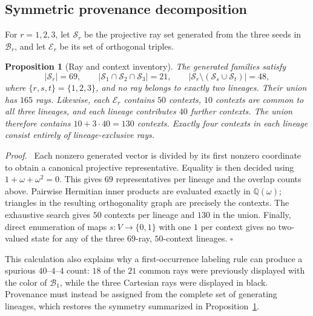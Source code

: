 \documentclass[%
  reprint,
  superscriptaddress,
  showpacs,
  showkeys,
  amsmath,amssymb,
  pra,
  longbibliography,
  floatfix,
  x11names
]{revtex4-2}
\newenvironment{revision}{\begingroup\color{revisionblue}}{\endgroup}
\newtheorem{proposition}{Proposition}
\newenvironment{proof}{\par\noindent\textit{Proof.}\ }{\hfill$\square$\par}
\begin{document}
\begin{revision}
\subsection{Symmetric provenance decomposition}

For $r=1,2,3$, let $\mathcal{S}_r$ be the projective ray set generated from the three seeds in $\mathcal{B}_r$, and let $\mathcal{E}_r$ be its set of orthogonal triples.

\begin{proposition}[Ray and context inventory]
\label{prop:provenance}
The generated families satisfy
\[
|\mathcal{S}_r|=69,\qquad
|\mathcal{S}_1\cap\mathcal{S}_2\cap\mathcal{S}_3|=21,
\qquad |\mathcal{S}_r\setminus(\mathcal{S}_s\cup\mathcal{S}_t)|=48,
\]
where $\{r,s,t\}=\{1,2,3\}$, and no ray belongs to exactly two lineages.  Their union has $165$ %
rays.  Likewise, each $\mathcal{E}_r$ contains $50$ contexts, $10$ contexts are common to all three lineages, and each lineage contributes $40$ further contexts.  The union therefore contains $10+3\cdot40=130$ contexts.  Exactly four contexts in each lineage consist entirely of lineage-exclusive rays.
\end{proposition}

\begin{proof}
Each nonzero generated vector is divided by its first nonzero coordinate to obtain a canonical projective representative.  Equality is then decided using $1+\omega+\omega^2=0$.  This gives $69$ representatives per lineage and the overlap counts above.  Pairwise Hermitian inner products are evaluated exactly in $\mathbb{Q}(\omega)$; triangles in the resulting orthogonality graph are precisely the contexts.  The exhaustive search gives $50$ contexts per lineage and $130$ in the union.  Finally, direct enumeration of maps $s:V\to\{0,1\}$ with one $1$ per context gives no two-valued state for any of the three $69$-ray, $50$-context lineages.
\end{proof}

This calculation also explains why a first-occurrence labeling rule can produce a spurious $40$--$4$--$4$ count: $18$ of the $21$ common rays were previously displayed with the color of $\mathcal{B}_1$, while the three Cartesian rays were displayed in black.  Provenance must instead be assigned from the complete set of generating lineages, which restores the symmetry summarized in Proposition~\ref{prop:provenance}.
\end{revision}
\end{document}

